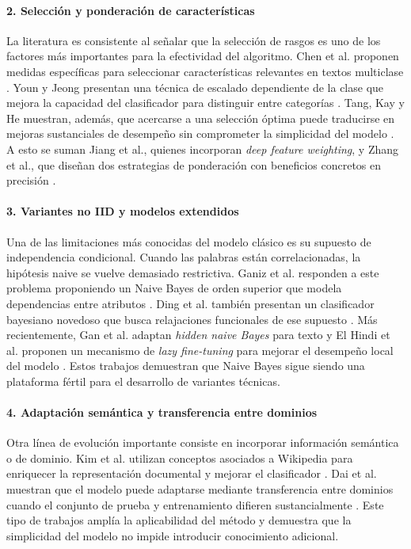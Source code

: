 \paragraph{2. Selección y ponderación de características}

La literatura es consistente al señalar que la selección de rasgos es uno de los factores más importantes para la efectividad del algoritmo. Chen et al. proponen medidas específicas para seleccionar características relevantes en textos multiclase \cite{CHEN20095432}. Youn y Jeong presentan una técnica de escalado dependiente de la clase que mejora la capacidad del clasificador para distinguir entre categorías \cite{YOUN2009477}. Tang, Kay y He muestran, además, que acercarse a una selección óptima puede traducirse en mejoras sustanciales de desempeño sin comprometer la simplicidad del modelo \cite{Tang20162508}. A esto se suman Jiang et al., quienes incorporan \textit{deep feature weighting}, y Zhang et al., que diseñan dos estrategias de ponderación con beneficios concretos en precisión \cite{Jiang2016,ZHANG2016137}.

\paragraph{3. Variantes no IID y modelos extendidos}

Una de las limitaciones más conocidas del modelo clásico es su supuesto de independencia condicional. Cuando las palabras están correlacionadas, la hipótesis naive se vuelve demasiado restrictiva. Ganiz et al. responden a este problema proponiendo un Naive Bayes de orden superior que modela dependencias entre atributos \cite{Ganiz20111022}. Ding et al. también presentan un clasificador bayesiano novedoso que busca relajaciones funcionales de ese supuesto \cite{4554061}. Más recientemente, Gan et al. adaptan \textit{hidden naive Bayes} para texto y El Hindi et al. proponen un mecanismo de \textit{lazy fine-tuning} para mejorar el desempeño local del modelo \cite{Gan2021,ELHINDI2020106652}. Estos trabajos demuestran que Naive Bayes sigue siendo una plataforma fértil para el desarrollo de variantes técnicas.

\paragraph{4. Adaptación semántica y transferencia entre dominios}

Otra línea de evolución importante consiste en incorporar información semántica o de dominio. Kim et al. utilizan conceptos asociados a Wikipedia para enriquecer la representación documental y mejorar el clasificador \cite{KIM2018128}. Dai et al. muestran que el modelo puede adaptarse mediante transferencia entre dominios cuando el conjunto de prueba y entrenamiento difieren sustancialmente \cite{10.5555/1619645.1619732}. Este tipo de trabajos amplía la aplicabilidad del método y demuestra que la simplicidad del modelo no impide introducir conocimiento adicional.

